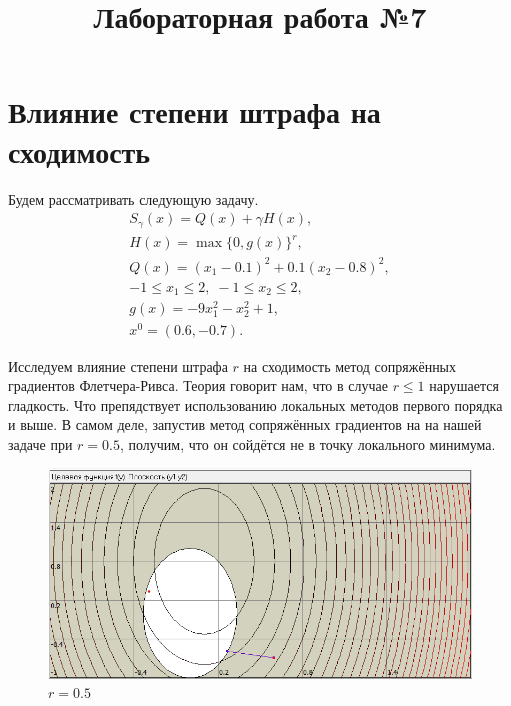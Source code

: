 

\title{Лабораторная работа №7}
\author{}
\date{}



\maketitle

\section{Влияние степени штрафа на сходимость}
Будем рассматривать следующую задачу.
\begin{gather*}
    S_\gamma(x)=Q(x) + \gamma H(x), \\
    H(x) = \max{\{0, g(x)\}}^r, \\
    Q(x) = (x_1 - 0.1)^2 + 0.1(x_2 - 0.8)^2, \\
    -1 \le x_1 \le 2, \; -1 \le x_2 \le 2, \\
    g(x) = -9x_1^2 - x_2^2 + 1, \\
    x^0 = (0.6, -0.7).
\end{gather*}

Исследуем влияние степени штрафа $r$ на сходимость метод сопряжённых градиентов Флетчера-Ривса.
Теория говорит нам, что в случае $r \le 1$ нарушается гладкость. Что препядствует использованию локальных методов первого порядка и выше. В самом деле, запустив метод сопряжённых градиентов на на нашей задаче при $r = 0.5$, получим, что он сойдётся не в точку локального минимума.
\begin{figure}[H]
    \centering
    \includegraphics{05.png}
    \caption{$r = 0.5$}
\end{figure}

